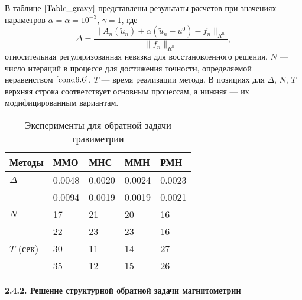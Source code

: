 В таблице $\ref{Table_gravy}$ представлены результаты расчетов при значениях параметров $\bar\alpha=\alpha=10^{-3}$, $\gamma=1$, где
\begin{equation}\label{form6.7}
\Delta=\frac{\|A_n(\tilde{u}_n)+\alpha(\tilde{u}_n-u^0)-f_n\|_{R^n}}{\|f_n\|_{R^n}},
\end{equation}
относительная регуляризованная невязка для восстановленного решения, $N$ --- число итераций в процессе для достижения точности, определяемой неравенством $\eqref{cond6.6}$, $T$ --- время реализации метода. В позициях для $\Delta$, $N$, $T$ верхняя строка соответствует основным процессам, а нижняя --- их модифицированным вариантам.
\begin{table}[H]
	\centering
	\renewcommand{\arraystretch}{1.5}
	\caption{Эксперименты для обратной задачи гравиметрии}
	\label{Table_gravy}
	\begin{tabular}{|p{}|p{}|p{}|p{}|p{}|}
		\hline
		\rule{0cm}{0.5cm}
		\textbf{Методы} & \textbf{ММО} & \textbf{МНС} & \textbf{ММН} & \textbf{РМН} \\ \hline
		\rule{0cm}{0.5cm}
		{$\Delta$} & 0.0048 & 0.0020 & 0.0024 & 0.0023	 \\ \cline{2-5} 
		\rule{0cm}{0.5cm}
		&  0.0094   & 0.0019    &  0.0019   &  0.0021   \\ \hline
		\rule{0cm}{0.5cm}
		{$N$} & 17  &  21   &   20  &  16    \\ \cline{2-5}
		\rule{0cm}{0.5cm}
		&  22   &   23  &  23   &  16   \\ \hline
		\rule{0cm}{0.5cm}
		{$T$ (сек)}    &  30   &  11   &  14  & 27    \\ \cline{2-5}
		\rule{0cm}{0.5cm}
		& 35   & 12    &  15   &   26  \\ \hline
	\end{tabular}
\end{table}

{\bfseries 2.4.2. Решение структурной обратной задачи магнитометрии}
 
